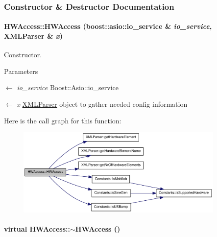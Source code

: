 \subsubsection{Constructor \& Destructor Documentation}
\hypertarget{class_h_w_access_a13743506121dae31b4b8622ed8996897}{
\paragraph[{HWAccess}]{\setlength{\rightskip}{0pt plus 5cm}HWAccess::HWAccess (boost::asio::io\_\-service \& {\em io\_\-service}, \/  {\bf XMLParser} \& {\em x})}\hfill}
\label{class_h_w_access_a13743506121dae31b4b8622ed8996897}


Constructor. 
\begin{DoxyParams}{Parameters}
\item[\mbox{$\leftarrow$} {\em io\_\-service}]Boost::Asio::io\_\-service \item[\mbox{$\leftarrow$} {\em x}]\hyperlink{class_x_m_l_parser}{XMLParser} object to gather needed config information \end{DoxyParams}


Here is the call graph for this function:\nopagebreak
\begin{figure}[H]
\begin{center}
\leavevmode
\includegraphics[width=290pt]{class_h_w_access_a13743506121dae31b4b8622ed8996897_cgraph}
\end{center}
\end{figure}
\hypertarget{class_h_w_access_ad72009e954effa86c26a9b21cc8c6b9f}{
\paragraph[{$\sim$HWAccess}]{\setlength{\rightskip}{0pt plus 5cm}virtual HWAccess::$\sim$HWAccess ()}\hfill}
\label{class_h_w_access_ad72009e954effa86c26a9b21cc8c6b9f}



